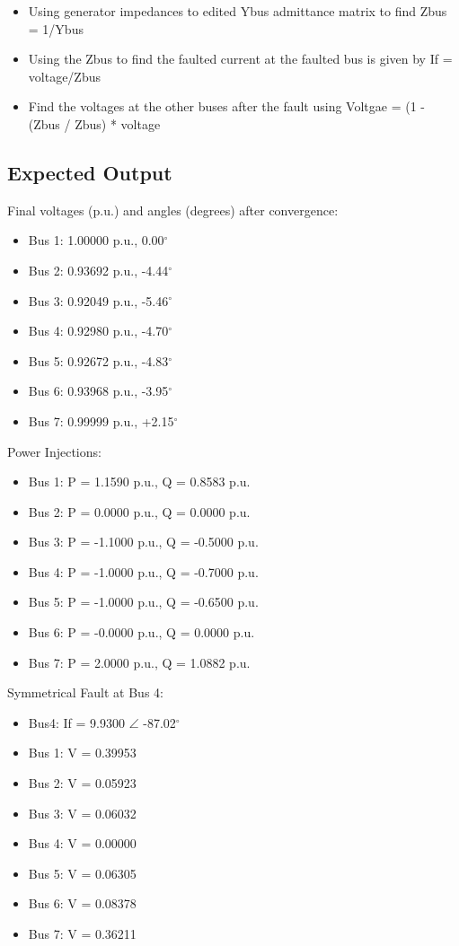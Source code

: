 \documentclass{article}
\begin{document}
	\begin{itemize}
		\item Using generator impedances to edited Ybus admittance matrix to find Zbus = 1/Ybus
		\item Using the Zbus to find the faulted current at the faulted bus is given by If = voltage/Zbus
		\item Find the voltages at the other buses after the fault using Voltgae = (1 - (Zbus / Zbus) * voltage
	\end{itemize}
	
	\subsection{Expected Output}
	Final voltages (p.u.) and angles (degrees) after convergence:
	
	\begin{itemize}
		\item Bus 1: 1.00000 p.u., 0.00$^{\circ}$
		\item Bus 2: 0.93692 p.u., -4.44$^{\circ}$
		\item Bus 3: 0.92049 p.u., -5.46$^{\circ}$
		\item Bus 4: 0.92980 p.u., -4.70$^{\circ}$
		\item Bus 5: 0.92672 p.u., -4.83$^{\circ}$
		\item Bus 6: 0.93968 p.u., -3.95$^{\circ}$
		\item Bus 7: 0.99999 p.u., +2.15$^{\circ}$
	\end{itemize}
	
	\noindent
	Power Injections:
	
	\begin{itemize}
		\item Bus 1: P = 1.1590 p.u., Q = 0.8583 p.u.
		\item Bus 2: P = 0.0000 p.u., Q = 0.0000 p.u.
		\item Bus 3: P = -1.1000 p.u., Q = -0.5000 p.u.
		\item Bus 4: P = -1.0000 p.u., Q = -0.7000 p.u.
		\item Bus 5: P = -1.0000 p.u., Q = -0.6500 p.u.
		\item Bus 6: P = -0.0000 p.u., Q = 0.0000 p.u.
		\item Bus 7: P = 2.0000 p.u., Q = 1.0882 p.u.
	\end{itemize}
	
	\noindent
	Symmetrical Fault at Bus 4:
	
	\begin{itemize}
		\item Bus4: If = 9.9300 $\angle$ -87.02$^{\circ}$
		\item Bus 1: V = 0.39953
		\item Bus 2: V = 0.05923
		\item Bus 3: V = 0.06032
		\item Bus 4: V = 0.00000
		\item Bus 5: V = 0.06305
		\item Bus 6: V = 0.08378
		\item Bus 7: V = 0.36211
	\end{itemize}
	
\end{document}

